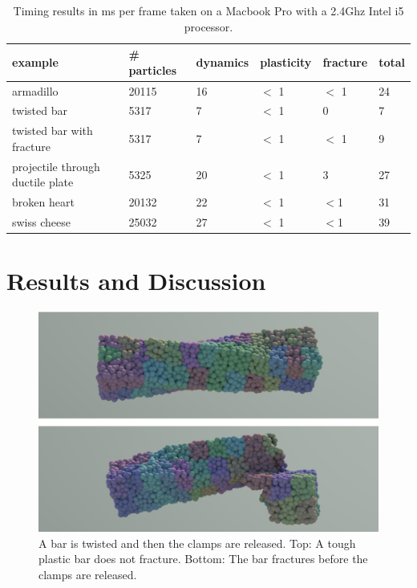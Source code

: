 \documentclass[conference]{acmsiggraph}
\begin{document}
\begin{table}
\begin{center}
\caption{Timing results in ms per frame taken on a Macbook Pro with a 2.4Ghz Intel i5 processor.}
\label{table:timing}
\begin{tabular}{|l|l|l|l|l|l|}
\hline
example & \# particles & dynamics & plasticity & fracture & total\\
\hline
armadillo & 20115 & 16  & $<$ 1 & $<$ 1 & 24\\
twisted bar & 5317 & 7 & $<$ 1  & 0 & 7\\
twisted bar with fracture & 5317 & 7  & $<$ 1 & $<$ 1 & 9 \\
projectile through ductile plate  & 5325 & 20 & $<$ 1 & 3 & 27\\
broken heart & 20132 & 22 & $<$ 1 & $<$1 & 31\\
swiss cheese & 25032 & 27 & $<$ 1 & $<$1 & 39 \\
\hline
\end{tabular}
\end{center}
\end{table}

\section{Results and Discussion}
\begin{figure}
\includegraphics[width=\linewidth]{Figures/twistingBarFinal.pdf}
\caption{A bar is twisted and then the clamps are released.  Top: A tough plastic bar does not fracture.  Bottom: The bar fractures before the clamps are released.}
\label{fig:twistedbar}
\end{figure}
\end{document}
